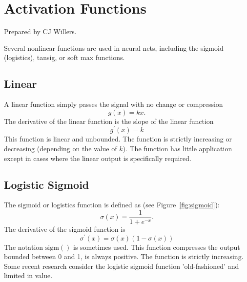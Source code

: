 
\chapter{Activation Functions}
\label{sec:ActivationFunctions}

Prepared by CJ Willers.

Several nonlinear functions are used in neural nets, including the sigmoid (logistics), tansig, or soft max
functions\cite{Pedamonti2018,Nwankpa2018,stackexchangeEllefsen2015,WikiPediaHyperbolicfunction2019,NickBecker2017,DustinStansbury2014,HamzaMahmood2018}. 

\section{Linear}

A linear function simply passes the signal with no change or compression
\begin{equation}
g(x)=kx.
\end{equation}  
The derivative of the linear function is the slope of the linear function
\begin{equation}
g^\prime(x) = k
\end{equation}
This function is linear and unbounded. The function is strictly increasing or decreasing (depending on the value of $k$). The function has little application except in cases where the linear output is specifically required.


\section{Logistic Sigmoid}

The sigmoid or logistics function is defined as (see Figure~\ref{fig:sigmoid}):
\begin{equation}
\sigma(x)
=\frac{1}{1+e^{-x}}.
\end{equation}  
The derivative of the sigmoid function is 
\begin{equation}
 \sigma^\prime(x)
 =\sigma(x)(1-\sigma(x))
\end{equation}
The notation $\textrm{sigm}()$ is sometimes used.
This function compresses the output bounded between 0 and 1, is always positive. The function is strictly increasing. Some recent research consider the logistic sigmoid function 'old-fashioned' and limited in value.

